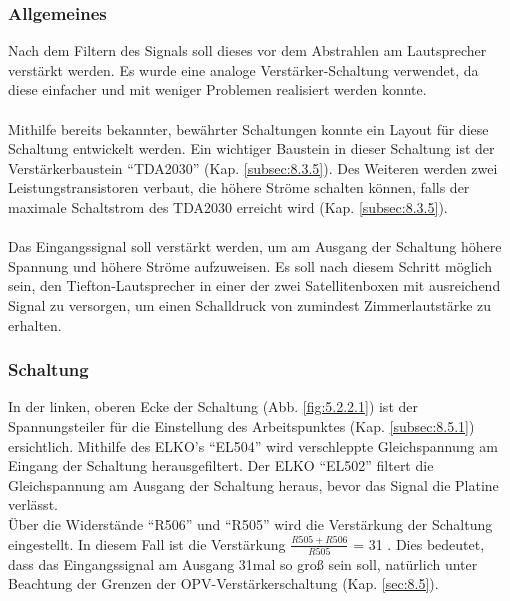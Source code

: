 \subsubsection{Allgemeines}\label{subsec:5.2.1}
Nach dem Filtern des Signals soll dieses vor dem Abstrahlen am Lautsprecher verstärkt werden.
Es wurde eine analoge Verstärker-Schaltung verwendet, da diese einfacher und mit weniger Problemen realisiert werden konnte.
\\ \\
Mithilfe bereits bekannter, bewährter Schaltungen konnte ein Layout für diese Schaltung entwickelt werden.
Ein wichtiger Baustein in dieser Schaltung ist der Verstärkerbaustein \enquote{TDA2030} (Kap. \ref{subsec:8.3.5}).
Des Weiteren werden zwei Leistungstransistoren verbaut, die höhere Ströme schalten können, falls der maximale Schaltstrom des TDA2030 erreicht wird (Kap. \ref{subsec:8.3.5}).
\\ \\
Das Eingangssignal soll verstärkt werden, um am Ausgang der Schaltung höhere Spannung und höhere Ströme aufzuweisen.
Es soll nach diesem Schritt möglich sein, den Tiefton-Lautsprecher in einer der zwei Satellitenboxen mit ausreichend Signal zu versorgen, um einen Schalldruck von zumindest Zimmerlautstärke zu erhalten. 

\newpage
\subsubsection{Schaltung}\label{subsec:5.2.2}
In der linken, oberen Ecke der Schaltung (Abb. \ref{fig:5.2.2.1}) ist der Spannungsteiler für die Einstellung des Arbeitspunktes (Kap. \ref{subsec:8.5.1}) ersichtlich.
Mithilfe des ELKO's \enquote{EL504} wird verschleppte Gleichspannung am Eingang der Schaltung herausgefiltert.
Der ELKO \enquote{EL502} filtert die Gleichspannung am Ausgang der Schaltung heraus, bevor das Signal die Platine verlässt. \\
Über die Widerstände \enquote{R506} und \enquote{R505} wird die Verstärkung der Schaltung eingestellt.
In diesem Fall ist die Verstärkung $\frac{R505+R506}{R505}$ = 31 .
Dies bedeutet, dass das Eingangssignal am Ausgang 31mal so groß sein soll, natürlich unter Beachtung der Grenzen der OPV-Verstärkerschaltung (Kap. \ref{sec:8.5}).


